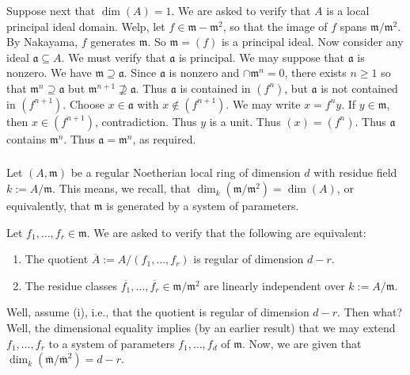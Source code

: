 \documentclass[reqno]{amsart}
\begin{document}
Suppose next that \(\dim(A) = 1\).
We are asked to verify that
\(A\) is a local principal ideal domain.
Welp,
let \(f \in \mathfrak{m} - \mathfrak{m}^2\),
so that the image of \(f\) spans \(\mathfrak{m}/\mathfrak{m}^2\).
By Nakayama, \(f\) generates \(\mathfrak{m}\).
So \(\mathfrak{m} = (f)\) is a principal ideal.
Now consider any ideal \(\mathfrak{a} \subseteq A\).
We must verify that \(\mathfrak{a}\) is principal.
We may suppose that \(\mathfrak{a}\) is nonzero.
We have \(\mathfrak{m} \supseteq \mathfrak{a}\).
Since \(\mathfrak{a}\) is nonzero and \(\cap \mathfrak{m}^n = 0\),
there exists \(n \geq 1\) so that \(\mathfrak{m}^n \supseteq
  \mathfrak{a}\)
but \(\mathfrak{m}^{n+1} \not\supseteq \mathfrak{a}\).
Thus \(\mathfrak{a}\) is contained in \((f^n)\),
but \(\mathfrak{a}\) is not contained in \((f^{n+1})\).
Choose \(x \in \mathfrak{a}\)
with \(x \notin (f^{n+1})\).
We may write \(x = f^n y\).
If \(y \in \mathfrak{m}\),
then \(x \in (f^{n+1})\), contradiction.
Thus \(y\) is a unit.
Thus \((x) = (f^n)\).
Thus \(\mathfrak{a}\) contains \(\mathfrak{m}^n\).
Thus \(\mathfrak{a} = \mathfrak{m}^n\), as required.



\subsubsection{}
\label{sec:org6abe4ac}

Let \((A,\mathfrak{m})\) be a regular Noetherian local ring of
dimension \(d\) with residue field \(k := A/\mathfrak{m}\).
This means,
we recall,
that \(\dim_k(\mathfrak{m}/\mathfrak{m}^2) = \dim(A)\),
or equivalently,
that \(\mathfrak{m}\) is generated by a system of parameters.

Let \(f_1,\dotsc,f_r \in \mathfrak{m}\).
We are asked to verify that the following are equivalent:
\begin{enumerate}
\item The quotient $\overline{A} := A / (f_1,\dotsc,f_r)$
  is regular of dimension $d-r$.
\item The residue classes $\overline{f_1}, \dotsc,
  \overline{f_r}
  \in \mathfrak{m} / \mathfrak{m}^2$
  are linearly independent over $k := A/\mathfrak{m}$.
\end{enumerate}
Well, assume (i), i.e.,
that the quotient is regular of dimension \(d-r\).
Then what?
Well, the dimensional equality
implies (by an earlier result) that
we may extend \(f_1,\dotsc,f_r\) to a system of parameters
\(f_1,\dotsc,f_d\) of \(\mathfrak{m}\).
Now, we are given
that \(\dim_{k}(\overline{\mathfrak{m} } / \overline{\mathfrak{m}
  }^2) = d - r\).
\end{document}
